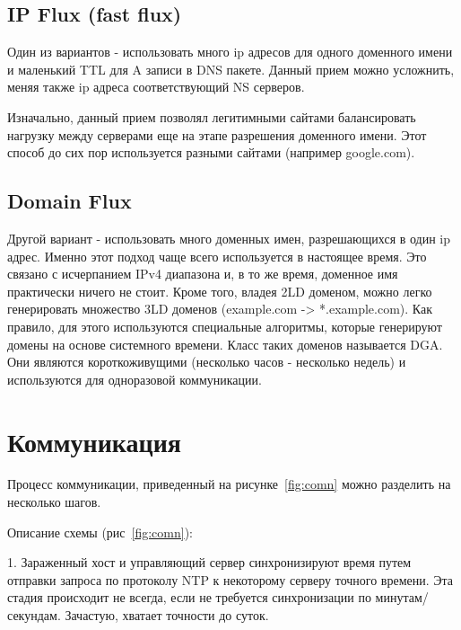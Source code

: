 \documentclass[a4paper,14pt]{extreport} %
\begin{document}
\subsection{IP Flux (fast flux)}
Один из вариантов - использовать много ip адресов для одного доменного имени и маленький TTL для A записи в DNS пакете. Данный прием можно усложнить, меняя также ip адреса соответствующий NS серверов.
	
Изначально, данный прием позволял легитимными сайтами балансировать нагрузку между серверами еще на этапе разрешения доменного имени. Этот способ до сих пор используется разными сайтами (например google.com).
	
\subsection{Domain Flux}
\label{ss:dflux}
Другой вариант - использовать много доменных имен, разрешающихся в один ip адрес. Именно этот подход чаще всего используется в настоящее время. Это связано с исчерпанием IPv4 диапазона и, в то же время, доменное имя практически ничего не стоит. Кроме того, владея 2LD доменом, можно легко генерировать множество 3LD доменов (example.com -> *.example.com).
Как правило, для этого используются специальные алгоритмы, которые генерируют домены на основе системного времени. Класс таких доменов называется DGA. Они являются короткоживущими (несколько часов - несколько недель) и используются для одноразовой коммуникации. 



\section{Коммуникация}
Процесс коммуникации, приведенный на рисунке~\ref{fig:comn} можно разделить на несколько шагов.

Описание схемы (рис~\ref{fig:comn}):
	
1. Зараженный хост и управляющий сервер синхронизируют время путем отправки запроса по протоколу NTP к некоторому серверу точного времени. Эта стадия происходит не всегда, если не требуется синхронизации по минутам/секундам. Зачастую, хватает точности до суток.
	
\end{document}
